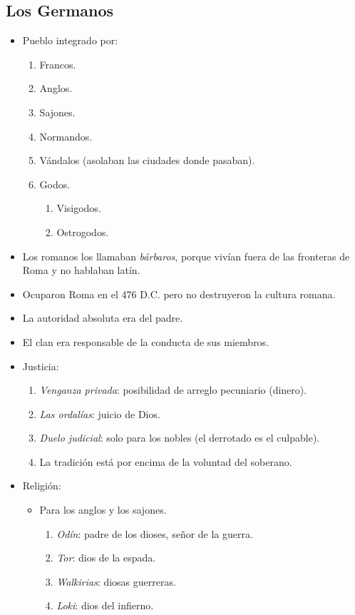 \subsection{Los Germanos}

\begin{itemize}

\item Pueblo integrado por:
\begin{enumerate}
	\item Francos.
	\item Anglos.
	\item Sajones.
	\item Normandos.
	\item Vándalos (asolaban las ciudades donde pasaban).
	\item Godos.
	\begin{enumerate}
		\item Visigodos.
		\item Ostrogodos.
	\end{enumerate}
\end{enumerate}

\item Los romanos los llamaban \emph{bárbaros}, porque vivían fuera de las fronteras de Roma y no hablaban latín.

\item Ocuparon Roma en el 476 D.C. pero no destruyeron la cultura romana.

\item La autoridad absoluta era del padre.

\item El clan era responsable de la conducta de sus miembros.

\item Justicia:
\begin{enumerate}
	\item \emph{Venganza privada}: posibilidad de arreglo pecuniario (dinero).
	\item \emph{Las ordalías}: juicio de Dios.
	\item \emph{Duelo judicial}: solo para los nobles (el derrotado es el culpable).
	\item La tradición está por encima de la voluntad del soberano.
\end{enumerate}

\item Religión:
\begin{itemize}
	\item Para los anglos y los sajones.
	\begin{enumerate}
		\item \emph{Odín}: padre de los dioses, señor de la guerra.
		\item \emph{Tor}: dios de la espada.
		\item \emph{Walkirias}: diosas guerreras.
		\item \emph{Loki}: dios del infierno.
	\end{enumerate}
\end{itemize}

\end{itemize}